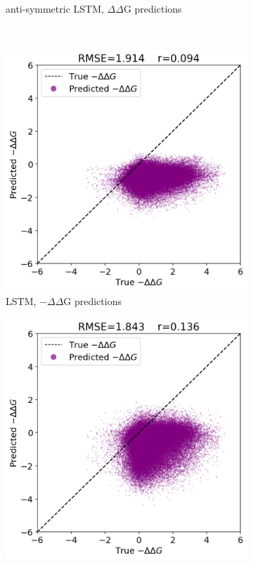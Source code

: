 \documentclass{article}
\newcommand{\dd}{$\Delta\Delta$}
\begin{document}
\begin{figure}[!htb]
\begin{subfigure}[b]{0.49\textwidth}
        \caption{anti-symmetric LSTM, \dd G predictions}
        \label{fig:lstmae}
    \end{subfigure}
    \\[3ex]
    \begin{subfigure}[b]{0.49\textwidth}
        \centering
        \includegraphics[width=\textwidth]{plots/lstm_error_reverse.png}
        \caption{LSTM, $-$\dd G predictions}
        \label{fig:lstmre}
    \end{subfigure}
    \hfill
    \begin{subfigure}[b]{0.49\textwidth}
        \centering
        \includegraphics[width=\textwidth]{plots/lstmanti_error_reverse.png}

\end{subfigure}
\end{figure}
\end{document}
